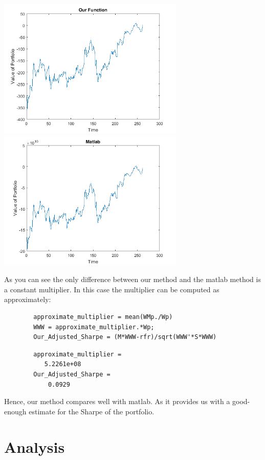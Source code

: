 \documentclass[12pt,titlepage,letter]{article}
\begin{document}
	\includegraphics [width=3.5in]{testing_01.png}\includegraphics [width=3.5in]{testing_02.png}
	\begin{par}
		As you can see the only difference between our method and the matlab method is a constant multiplier. In this case the multiplier can be computed as approximately:
	\end{par} \vspace{1em}
	\begin{lstlisting}
		approximate_multiplier = mean(WMp./Wp)
		WWW = approximate_multiplier.*Wp;
		Our_Adjusted_Sharpe = (M*WWW-rfr)/sqrt(WWW'*S*WWW)
	\end{lstlisting}
    \color{lightgray} \begin{lstlisting}
		approximate_multiplier =
		   5.2261e+08
		Our_Adjusted_Sharpe =
		    0.0929
	\end{lstlisting} \color{black}
    \begin{par}
		Hence, our method compares well with matlab. As it provides us with a good-enough estimate for the Sharpe of the portfolio.
	\end{par} \vspace{1em}

\section{Analysis}
\end{document}
